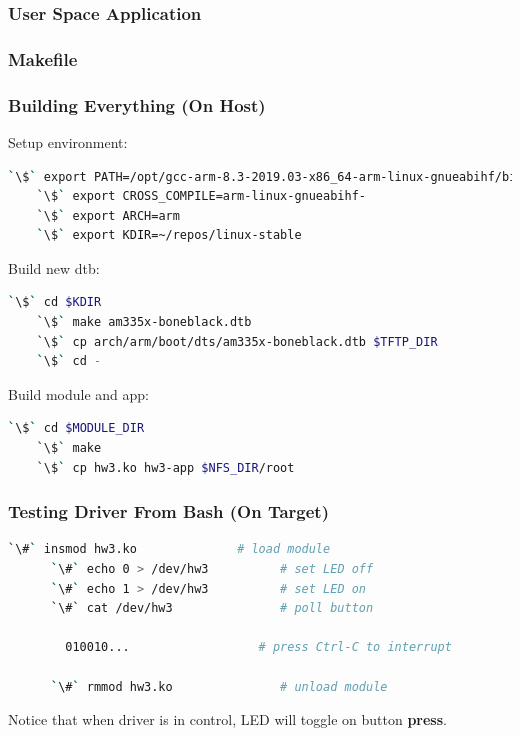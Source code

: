 \begin{frame}[containsverbatim,allowframebreaks=1]
  \frametitle{User Space Application}
  
\end{frame}

\begin{frame}[containsverbatim]
  \frametitle{Makefile}
  \vspace*{-3mm}
  
  \vspace*{-7mm}
\end{frame}

\begin{frame}[containsverbatim]
  \frametitle{Building Everything (On Host)}
  Setup environment:
  \begin{lstlisting}[language=bash,numbers=none]
    `\$` export PATH=/opt/gcc-arm-8.3-2019.03-x86_64-arm-linux-gnueabihf/bin:$PATH
    `\$` export CROSS_COMPILE=arm-linux-gnueabihf-
    `\$` export ARCH=arm
    `\$` export KDIR=~/repos/linux-stable
  \end{lstlisting}
  Build new dtb:
  \begin{lstlisting}[language=bash,numbers=none]
    `\$` cd $KDIR
    `\$` make am335x-boneblack.dtb
    `\$` cp arch/arm/boot/dts/am335x-boneblack.dtb $TFTP_DIR
    `\$` cd -
  \end{lstlisting}
  Build module and app:
  \begin{lstlisting}[language=bash,numbers=none]
    `\$` cd $MODULE_DIR
    `\$` make
    `\$` cp hw3.ko hw3-app $NFS_DIR/root
  \end{lstlisting}
\end{frame}

\begin{frame}[containsverbatim]
  \frametitle{Testing Driver From Bash (On Target)}
  \begin{lstlisting}[language=bash,numbers=none]
      `\#` insmod hw3.ko              # load module
      `\#` echo 0 > /dev/hw3          # set LED off
      `\#` echo 1 > /dev/hw3          # set LED on
      `\#` cat /dev/hw3               # poll button

        010010...                  # press Ctrl-C to interrupt

      `\#` rmmod hw3.ko               # unload module
  \end{lstlisting}
  Notice that when driver is in control, LED will toggle on button
  \textbf{press}.
\end{frame}

